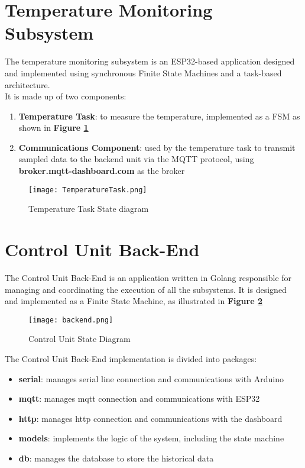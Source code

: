\documentclass{article}
\begin{document}
\section{Temperature Monitoring Subsystem}
The temperature monitoring subsystem is an ESP32-based application designed and implemented using synchronous Finite State Machines and a task-based architecture.\\
It is made up of two components:
\begin{enumerate}
    \item \textbf{Temperature Task}: to measure the temperature, implemented as a FSM as shown in \textbf{Figure \ref{fig:temp task}} 
    \item \textbf{Communications Component}: used by the temperature task to transmit sampled data to the backend unit via the MQTT protocol, using \textbf{broker.mqtt-dashboard.com} as the broker
\end{enumerate}
\begin{figure}[htp]
    \centering
    \texttt{[image: TemperatureTask.png]}
    \caption{Temperature Task State diagram }
    \label{fig:temp task}
\end{figure}
\newpage

\section{Control Unit Back-End}
The Control Unit Back-End is an application written in Golang responsible for managing and coordinating the execution of all the subsystems. It is designed and implemented as a Finite State Machine, as illustrated in \textbf{Figure \ref{fig:backend}}\\
\begin{figure}[htp]
    \centering
    \texttt{[image: backend.png]}
    \caption{Control Unit State Diagram}
    \label{fig:backend}
\end{figure}
\newpage
The Control Unit Back-End implementation is divided into packages:
\begin{itemize}
    \item \textbf{serial}: manages serial line connection and communications with Arduino
    \item \textbf{mqtt}: manages mqtt connection and communications with ESP32
    \item \textbf{http}: manages http connection and communications with the dashboard
    \item \textbf{models}: implements the logic of the system, including the state machine
    \item \textbf{db}: manages the database to store the historical data
\end{itemize}
\end{document}
